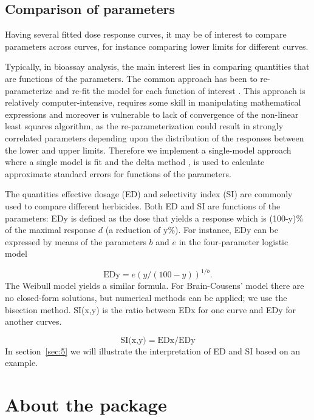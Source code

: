 \documentclass[a4paper]{article}
\begin{document}
\subsection{Comparison of parameters} \label{sec:2.2}

Having several fitted dose response curves, it may be of interest to compare parameters across curves, for instance comparing lower limits for
different curves. 

Typically, in bioassay analysis, the main interest lies in comparing quantities that are functions of the parameters. The common approach has been 
to re-parameterize and 
re-fit the model for each function of interest \citep{schabenberger&tharp&kells&penner:1999}. This approach is relatively computer-intensive, 
requires some skill in manipulating mathematical expressions and moreover is vulnerable to lack of convergence of the
non-linear least squares algorithm, as the re-parameterization could result in strongly correlated parameters depending upon the distribution of
the responses between the lower and upper limits. Therefore we implement a single-model approach where a single model is fit and the delta method 
\citep[chap.~3]{vandervaart:1998}, is used to calculate approximate standard errors for functions of the parameters.

The quantities effective dosage (ED) and selectivity index (SI) are commonly used to compare different herbicides. Both ED and SI are functions of the
parameters: EDy is defined as the dose that yields a response which is (100-y)\% of the maximal response $d$ (a reduction of y\%). 
For instance, EDy can be expressed by means of the parameters $b$ and $e$ in the four-parameter logistic model

\[
\mbox{EDy} = e (y/(100 - y))^{1/b}.
\] 
The Weibull model yields a similar formula. For Brain-Cousens' model there are no closed-form solutions, but numerical methods can be applied; we
use the bisection method. SI(x,y) is the ratio between EDx for one curve and EDy for another curves. 

\[
\mbox{SI(x,y)} = \mbox{EDx} / \mbox{EDy}
\]
In section~\ref{sec:5} we will illustrate the interpretation of ED and SI based on an example. 



\section{About the package} \label{sec:3}
\end{document}
